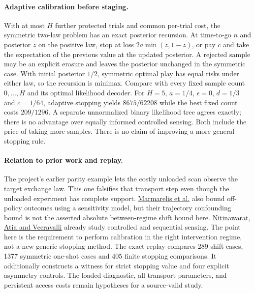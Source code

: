 \documentclass{article}
\begin{document}
\paragraph{Adaptive calibration before staging.}
With at most $H$ further protected trials and common per-trial cost,
the symmetric two-law problem has an exact posterior recursion.
At time-to-go $n$ and posterior $z$ on the positive law, stop at loss
$2a\min(z,1-z)$, or pay $c$ and take the expectation of the previous
value at the updated posterior. A rejected sample may be an explicit
erasure and leaves the posterior unchanged in the symmetric case.
With initial posterior $1/2$, symmetric optimal play has equal risks
under either law, so the recursion is minimax. Compare with every
fixed sample count $0,\dots,H$ and its optimal likelihood decoder.
For $H=5$, $a=1/4$, $\epsilon=0$, $d=1/3$ and $c=1/64$,
adaptive stopping yields $8675/62208$ while the best fixed count
costs $209/1296$. A separate unnormalized binary likelihood tree
agrees exactly; there is no advantage over equally informed
controlled sensing. Both include the price of taking more samples.
There is no claim of improving a more general stopping rule.

\paragraph{Relation to prior work and replay.}
The project's earlier parity example lets the costly unloaded scan
observe the target exchange law. This one falsifies that transport step
even though the unloaded experiment has complete support.
\href{https://proceedings.mlr.press/v286/marmarelis25a.html}{Marmarelis
et al.} also bound off-policy outcomes using a sensitivity model, but
their trajectory confounding bound is not the asserted absolute
between-regime shift bound here.
\href{https://arxiv.org/abs/1205.0858}{Nitinawarat, Atia and Veeravalli}
already study controlled and sequential sensing. The point here is the
requirement to perform calibration in the right intervention regime, not
a new generic stopping method.
The exact replay compares 289 shift cases, 1377 symmetric one-shot
cases and 405 finite stopping comparisons. It additionally constructs
a witness for strict stopping value and four explicit asymmetry
controls. The loaded diagnostic, all transport parameters, and
persistent access costs remain hypotheses for a source-valid study.
\end{document}
